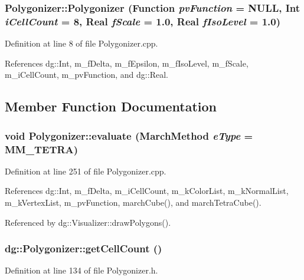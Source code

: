 \subsubsection{\setlength{\rightskip}{0pt plus 5cm}Polygonizer::Polygonizer ({\bf Function} {\em pv\-Function} = NULL, {\bf Int} {\em i\-Cell\-Count} = 8, {\bf Real} {\em f\-Scale} = 1.0, {\bf Real} {\em f\-Iso\-Level} = 1.0)}\label{classdg_1_1Polygonizer_a0}




Definition at line 8 of file Polygonizer.cpp.

References dg::Int, m\_\-f\-Delta, m\_\-f\-Epsilon, m\_\-f\-Iso\-Level, m\_\-f\-Scale, m\_\-i\-Cell\-Count, m\_\-pv\-Function, and dg::Real.

\subsection{Member Function Documentation}
\subsubsection{\setlength{\rightskip}{0pt plus 5cm}void Polygonizer::evaluate ({\bf March\-Method} {\em e\-Type} = MM\_\-TETRA)}\label{classdg_1_1Polygonizer_a24}




Definition at line 251 of file Polygonizer.cpp.

References dg::Int, m\_\-f\-Delta, m\_\-i\-Cell\-Count, m\_\-k\-Color\-List, m\_\-k\-Normal\-List, m\_\-k\-Vertex\-List, m\_\-pv\-Function, march\-Cube(), and march\-Tetra\-Cube().

Referenced by dg::Visualizer::draw\-Polygons().
\subsubsection{ dg::Polygonizer::get\-Cell\-Count ()\hspace{0.3cm}{\tt  [inline]}}\label{classdg_1_1Polygonizer_a6}




Definition at line 134 of file Polygonizer.h.
